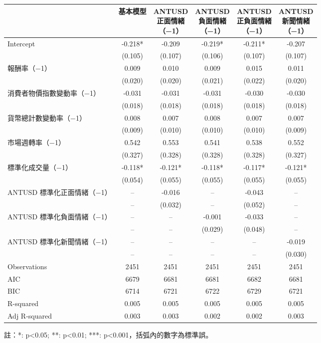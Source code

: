 \documentclass{article}
\begin{document}
    \fontsize{12pt}{14pt}\selectfont
    
    \begin{tabular}{lccccc}
\toprule
 & 基本模型 & \makecell{ANTUSD\\正面情緒\\（−1）} & \makecell{ANTUSD\\負面情緒\\（−1）} & \makecell{ANTUSD\\正負面情緒\\（−1）} & \makecell{ANTUSD\\新聞情緒\\（−1）} \\
\midrule
Intercept & -0.218* & -0.209 & -0.219* & -0.211* & -0.207 \\
 & (0.105) & (0.107) & (0.106) & (0.107) & (0.107) \\
報酬率（−1） & 0.009 & 0.010 & 0.009 & 0.015 & 0.011 \\
 & (0.020) & (0.020) & (0.021) & (0.022) & (0.020) \\
消費者物價指數變動率（−1） & -0.031 & -0.031 & -0.031 & -0.030 & -0.030 \\
 & (0.018) & (0.018) & (0.018) & (0.018) & (0.018) \\
貨幣總計數變動率（−1） & 0.008 & 0.007 & 0.008 & 0.007 & 0.007 \\
 & (0.009) & (0.010) & (0.010) & (0.010) & (0.009) \\
市場週轉率（−1） & 0.542 & 0.553 & 0.541 & 0.538 & 0.552 \\
 & (0.327) & (0.328) & (0.328) & (0.328) & (0.327) \\
標準化成交量（−1） & -0.118* & -0.121* & -0.118* & -0.117* & -0.121* \\
 & (0.054) & (0.055) & (0.055) & (0.055) & (0.055) \\
ANTUSD 標準化正面情緒（−1） & -- & -0.016 & -- & -0.043 & -- \\
 & -- & (0.032) & -- & (0.052) & -- \\
ANTUSD 標準化負面情緒（−1） & -- & -- & -0.001 & -0.033 & -- \\
 & -- & -- & (0.029) & (0.048) & -- \\
ANTUSD 標準化新聞情緒（−1） & -- & -- & -- & -- & -0.019 \\
 & -- & -- & -- & -- & (0.030) \\
\midrule
Observations &   2451 &   2451 &   2451 &   2451 &   2451 \\
AIC &    6679 &    6681 &    6681 &    6682 &    6681 \\
BIC &    6714 &    6721 &    6722 &    6729 &    6721 \\
R-squared &    0.005 &    0.005 &    0.005 &    0.005 &    0.005 \\
Adj R-squared &    0.003 &    0.003 &    0.002 &    0.002 &    0.003 \\
\bottomrule
\end{tabular}

    
    \fontsize{11pt}{14pt}\selectfont
    註：*: p<0.05; **: p<0.01; ***: p<0.001，括弧內的數字為標準誤。
    
\end{document}
